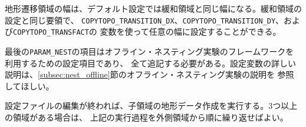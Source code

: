 地形遷移領域の幅は、デフォルト設定では緩和領域と同じ幅になる。緩和領域の設定と同じ要領で、
\verb|COPYTOPO_TRANSITION_DX|、\verb|COPYTOPO_TRANSITION_DY|、および\verb|COPYTOPO_TRANSFACT|の
変数を使って任意の幅に設定することができる。

最後の\verb|PARAM_NEST|の項目はオフライン・ネスティング実験のフレームワークを利用するための設定項目であり、
全て追記する必要がある。設定変数の詳しい説明は、\ref{subsec:nest_offline}節のオフライン・ネスティング実験の説明を
参照してほしい。

設定ファイルの編集が終われば、子領域の地形データ作成を実行する。3つ以上の領域がある場合は、
上記の実行過程を外側領域から順に繰り返せばよい。



